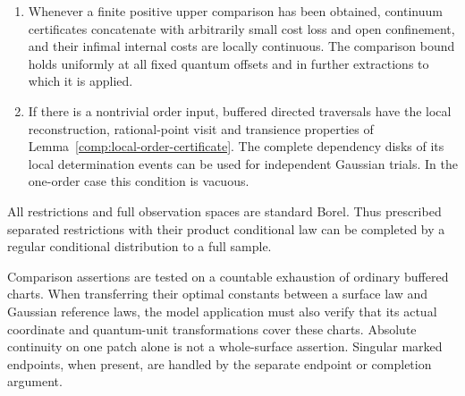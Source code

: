 \begin{definition}
\begin{enumerate}[label=(\roman*)]
argument, the model supplies uniform local tightness and modulus bounds
for the coordinates it retains.  These bounds give relative compactness
and a jointly convergent diagonal discrete subsequence.  In it, all marked
observations, reference experiments, fixed quantum offsets, and actual
joint field/internal-metric readouts can be retained under further
extraction.  This requirement includes the varying laws selected in
amplification and equality-tangent extraction, with the bounds uniform
along each selected indexed sequence; it makes no compactness
claim for uncontrolled sequences of laws.  Each fixed retained time unit still tends to
infinity in lattice steps.  Additional continuum coordinates are drawn
from their canonical conditional law independently of the entire raw
actual and reference observation array given the full contour and cuts.
The local kernel identities hold anew in each resulting law, with its
own extracted reference kernels.  Existing uniform comparison bounds
pass through these marked extractions.
\item Whenever a finite positive upper comparison has been obtained,
continuum certificates concatenate with arbitrarily small cost loss and
open confinement, and their infimal internal costs are locally
continuous.  The comparison bound holds uniformly at all fixed quantum
offsets and in further extractions to which it is applied.
\item If there is a nontrivial order input, buffered directed
traversals have the local reconstruction, rational-point visit and
transience properties of Lemma~\ref{comp:local-order-certificate}.
The complete dependency disks of its local determination events can be
used for independent Gaussian trials.  In the one-order case this
condition is vacuous.
\end{enumerate}
All restrictions and full observation spaces are standard Borel.  Thus
prescribed separated restrictions with their product conditional law can
be completed by a regular conditional distribution to a full sample.
\end{definition}

Comparison assertions are tested on a countable exhaustion of ordinary
buffered charts.  When transferring their optimal constants between a
surface law and Gaussian reference laws, the model application must also
verify that its actual coordinate and quantum-unit transformations cover
these charts.  Absolute continuity on one patch alone is not a
whole-surface assertion.  Singular marked endpoints, when present, are
handled by the separate endpoint or completion argument.

